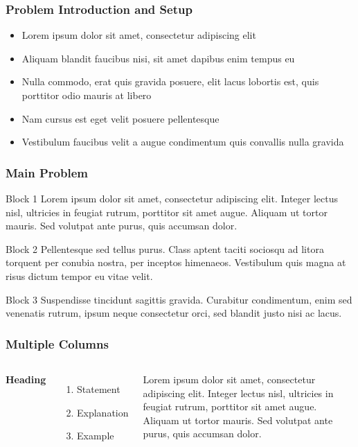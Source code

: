 \documentclass{beamer}
\begin{document}
\begin{frame}
\frametitle{Problem Introduction and Setup}
\begin{itemize}
\item Lorem ipsum dolor sit amet, consectetur adipiscing elit
\item Aliquam blandit faucibus nisi, sit amet dapibus enim tempus eu
\item Nulla commodo, erat quis gravida posuere, elit lacus lobortis est, quis porttitor odio mauris at libero
\item Nam cursus est eget velit posuere pellentesque
\item Vestibulum faucibus velit a augue condimentum quis convallis nulla gravida
\end{itemize}
\end{frame}


\begin{frame}
\frametitle{Main Problem}
\begin{block}{Block 1}
Lorem ipsum dolor sit amet, consectetur adipiscing elit. Integer lectus nisl, ultricies in feugiat rutrum, porttitor sit amet augue. Aliquam ut tortor mauris. Sed volutpat ante purus, quis accumsan dolor.
\end{block}

\begin{block}{Block 2}
Pellentesque sed tellus purus. Class aptent taciti sociosqu ad litora torquent per conubia nostra, per inceptos himenaeos. Vestibulum quis magna at risus dictum tempor eu vitae velit.
\end{block}

\begin{block}{Block 3}
Suspendisse tincidunt sagittis gravida. Curabitur condimentum, enim sed venenatis rutrum, ipsum neque consectetur orci, sed blandit justo nisi ac lacus.
\end{block}
\end{frame}


\begin{frame}
\frametitle{Multiple Columns}
\begin{columns}[c] %

\textbf{Heading}
\begin{enumerate}
\item Statement
\item Explanation
\item Example
\end{enumerate}

Lorem ipsum dolor sit amet, consectetur adipiscing elit. Integer lectus nisl, ultricies in feugiat rutrum, porttitor sit amet augue. Aliquam ut tortor mauris. Sed volutpat ante purus, quis accumsan dolor.

\end{columns}
\end{frame}
\end{document}
